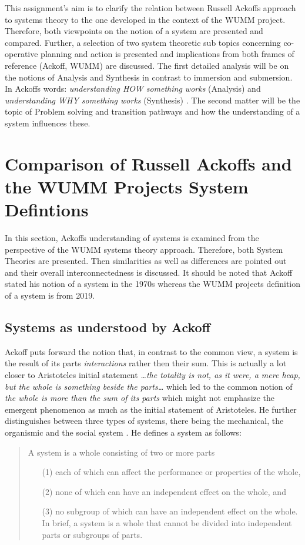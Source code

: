 \documentclass[a4paper,11pt]{article}
\begin{document}
This assignment's aim is to clarify the relation between Russell Ackoffs
approach to systems theory to the one developed in the context of the WUMM
project. Therefore, both viewpoints on the notion of a system are presented
and compared. Further, a selection of two system theoretic sub topics
concerning co-operative planning and action is presented and implications from
both frames of reference (Ackoff, WUMM) are discussed. The first detailed
analysis will be on the notions of Analysis and Synthesis in contrast to
immersion and submersion. In Ackoffs words: \textit{understanding HOW
  something works} (Analysis) and \textit{understanding WHY something works}
(Synthesis) \cite{ackoff1994systems}. The second matter will be the topic of
Problem solving and transition pathways and how the understanding of a system
influences these.


\section{Comparison of Russell Ackoffs and the WUMM Projects System
  Defintions} 
\label{system_theory}
In this section, Ackoffs understanding of systems is examined from the
perspective of the WUMM systems theory approach. Therefore, both System
Theories are presented. Then similarities as well as differences are pointed
out and their overall interconnectedness is discussed. It should be noted that
Ackoff stated his notion of a system in the 1970s whereas the WUMM projects
definition of a system is from 2019.

\subsection{Systems as understood by Ackoff}

Ackoff puts forward the notion that, in contrast to the common view, a system
is the result of its parts \textit{interactions} rather then their sum. This
is actually a lot closer to Aristoteles initial statement \emph{…the totality
  is not, as it were, a mere heap, but the whole is something beside the
  parts…  } which led to the common notion of \emph{the whole is more than the
  sum of its parts } which might not emphasize the emergent phenomenon as much
as the initial statement of Aristoteles. He further distinguishes between
three types of systems, there being the mechanical, the organismic and the
social system \cite{ackoff1994systems}.  He defines a system as follows:
\begin{quote}
  A system is a whole consisting of two or more parts
  \begin{itemize}
  \item[(1)] each of which can affect the performance or properties of the
    whole,
  \item[(2)] none of which can have an independent effect on the whole, and
  \item[(3)] no subgroup of which can have an independent effect on the
    whole. In brief, a system is a whole that cannot be divided into
    independent parts or subgroups of parts.
  \end{itemize}
\end{quote}	
\end{document}
